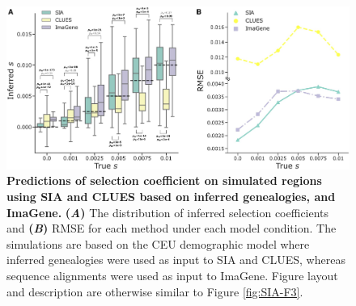 \begin{figure}[h]
    \centering
    \includegraphics[width=\textwidth]{SIA_figs/SIA_F4.jpeg}
    \caption[Predictions of selection coefficient on simulated regions using \ac{SIA} and CLUES based on inferred genealogies, and ImaGene.]{\textbf{Predictions of selection coefficient on simulated regions using \ac{SIA} and CLUES based on inferred genealogies, and ImaGene.} \textbf{(\textit{A})} The distribution of inferred selection coefficients and \textbf{(\textit{B})} \ac{RMSE} for each method under each model condition. The simulations are based on the CEU demographic model where inferred genealogies were used as input to \ac{SIA} and CLUES, whereas sequence alignments were used as input to ImaGene. Figure layout and description are otherwise similar to Figure \ref{fig:SIA-F3}.}
    \label{fig:SIA-F4}
\end{figure}


